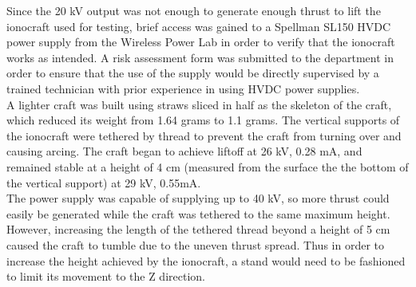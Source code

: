 \documentclass[11pt]{article}
\begin{document}
Since the 20 kV output was not enough to generate enough thrust to lift the ionocraft used for testing, brief access was gained to a Spellman SL150 HVDC power supply from the Wireless Power Lab in order to verify that the ionocraft works as intended. A risk assessment form was submitted to the department in order to ensure that the use of the supply would be directly supervised by a trained technician with prior experience in using HVDC power supplies.\\

A lighter craft was built using straws sliced in half as the skeleton of the craft, which reduced its weight from 1.64 grams to 1.1 grams. The vertical supports of the ionocraft were tethered by thread to prevent the craft from turning over and causing arcing. The craft began to achieve liftoff at 26 kV, 0.28 mA, and remained stable at a height of 4 cm (measured from the surface the the bottom of the vertical support) at 29 kV, 0.55mA.\\

The power supply was capable of supplying up to 40 kV, so more thrust could easily be generated while the craft was tethered to the same maximum height. However, increasing the length of the tethered thread beyond a height of 5 cm caused the craft to tumble due to the uneven thrust spread. Thus in order to increase the height achieved by the ionocraft, a stand would need to be fashioned to limit its movement to the Z direction.
\end{document}
